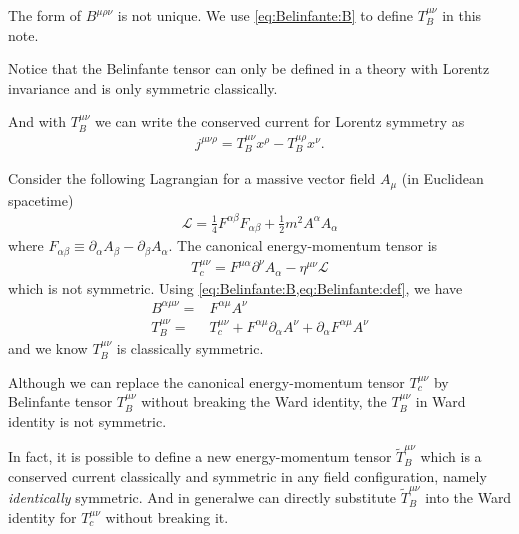 \documentclass[10pt]{article}
\begin{document}
\begin{remark}
    The form of $B^{\mu\rho\nu}$ is not unique.
    We use \cref{eq:Belinfante:B} to define $T_B^{\mu\nu}$ in this note.

    Notice that the Belinfante tensor can only be defined in a theory with Lorentz invariance and is only symmetric classically.

    And with $T^{\mu\nu}_B$ we can write the conserved current for Lorentz symmetry as\snm
    \begin{align}
        j^{\mu\nu\rho}=T^{\mu\nu}_B x^\rho-T^{\mu\rho}_B x^\nu.\label{eq:Belinfante:after_stress_tensor}
    \end{align}
\end{remark}
\begin{example}
    Consider the following Lagrangian for a massive vector field $A_\mu$ (in Euclidean spacetime)
    \begin{align}
        \mathcal{L}=\frac{1}{4}F^{\alpha\beta}F_{\alpha\beta}+\frac{1}{2}m^2 A^\alpha A_\alpha
    \end{align}
    where $F_{\alpha\beta}\equiv\partial_\alpha A_\beta-\partial_\beta A_\alpha$.
    The canonical energy-momentum tensor is
    \begin{align}
        T^{\mu\nu}_c=F^{\mu\alpha}\partial^\nu A_\alpha-\eta^{\mu\nu}\mathcal{L}
    \end{align}
    which is not symmetric.
    Using \cref{eq:Belinfante:B,eq:Belinfante:def}, we have
    \begin{align}
        B^{\alpha\mu\nu}= & F^{\alpha\mu}A^\nu                                                                 \\
        T^{\mu\nu}_B=     & T^{\mu\nu}_c+F^{\alpha\mu}\partial_\alpha A^\nu+\partial_\alpha F^{\alpha\mu}A^\nu
    \end{align}
    and we know $T^{\mu\nu}_B$ is classically symmetric.
\end{example}
\begin{intu}
    Although we can replace the canonical energy-momentum tensor $T^{\mu\nu}_c$ by Belinfante tensor $T^{\mu\nu}_B$ without breaking the Ward identity, the $T^{\mu\nu}_B$ in Ward identity is not symmetric\snm.

    In fact, it is possible to define a new energy-momentum tensor $\tilde{T}^{\mu\nu}_B$ which is a conserved current classically and symmetric in any field configuration, namely \textit{identically} symmetric.
    And in general\snm we can directly substitute $\tilde{T}^{\mu\nu}_B$ into the Ward identity for $T^{\mu\nu}_c$ without breaking it.
\end{intu}
\end{document}

